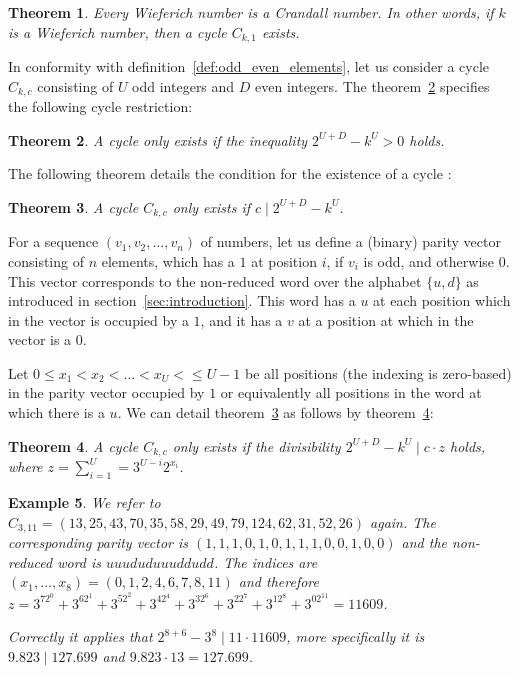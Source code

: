 \documentclass[12pt]{amsart}
\newtheorem{theorem}{Theorem}[section]
\newtheorem{example}[theorem]{Example}
\theoremstyle{definition}
\begin{document}
\begin{theorem}
\label{theo:crandall_wieferich}
Every Wieferich number is a Crandall number. In other words, if $k$ is a Wieferich number, then a cycle $C_{k,1}$ exists.
\end{theorem}

In conformity with definition~\ref{def:odd_even_elements}, let us consider a cycle $C_{k,c}$ consisting of $U$ odd integers and $D$ even integers. The theorem~\ref{theo:cycle_restriction_1} specifies the following cycle restriction:

\begin{theorem}
\label{theo:cycle_restriction_1}
A cycle only exists if the inequality $2^{U+D}-k^U>0$ holds.
\end{theorem}

The following theorem details the condition for the existence of a cycle \cite{Ref_Cox_2012}:

\begin{theorem}
\label{theo:cycle_restriction_2}
A cycle $C_{k,c}$ only exists if $c\mid2^{U+D}-k^U$.
\end{theorem}

For a sequence $(v_1,v_2,\ldots,v_n)$ of numbers, let us define a (binary) parity vector consisting of $n$ elements, which has a $1$ at position $i$, if $v_i$ is odd, and otherwise $0$. This vector corresponds to the non-reduced word over the alphabet $\{u,d\}$ as introduced in section~\ref{sec:introduction}. This word has a $u$ at each position which in the vector is occupied by a $1$, and it has a $v$ at a position at which in the vector is a $0$.

Let $0\le x_1<x_2<\ldots<x_{U}<\le U-1$ be all positions (the indexing is zero-based) in the parity vector occupied by $1$ or equivalently all positions in the word at which there is a $u$. We can detail theorem~\ref{theo:cycle_restriction_2} as follows by theorem~\ref{theo:cycle_restriction_3}:

\begin{theorem}
\label{theo:cycle_restriction_3}
A cycle $C_{k,c}$ only exists if the divisibility $2^{U+D}-k^U\mid c\cdot z$ holds, where $z=\sum_{i=1}^{U}=3^{U-i}2^{x_i}$.
\end{theorem}

\begin{example}
We refer to $C_{3,11}=(13,25,43,70,35,58,29,49,79,124,62,31,52,26)$ again. The corresponding parity vector is $(1,1,1,0,1,0,1,1,1,0,0,1,0,0)$ and the non-reduced word is $uuududuuuddudd$. The indices are $(x_1,\ldots,x_8)=(0,1,2,4,6,7,8,11)$ and therefore $z=3^72^0+3^62^1+3^52^2+3^42^4+3^32^6+3^22^7+3^12^8+3^02^{11}=11609$.

\par\medskip\noindent
Correctly it applies that $2^{8+6}-3^8\mid11\cdot11609$, more specifically it is $9.823\mid127.699$ and $9.823\cdot13=127.699$. 
\end{example}
\end{document}
